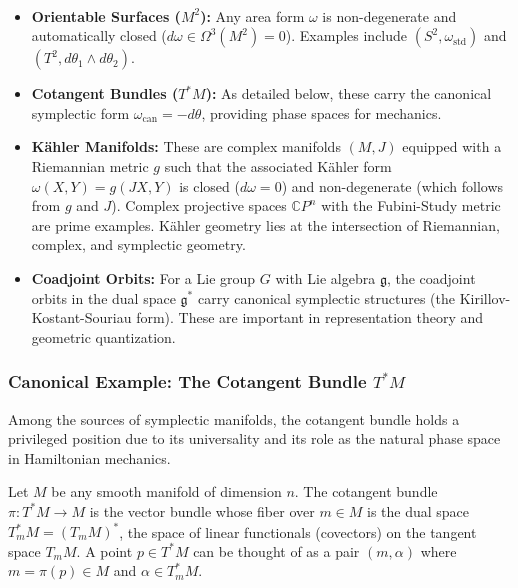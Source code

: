 \begin{example}
    \label{ex:symp_sources}
    \,
    \begin{itemize}
        \item \textbf{Orientable Surfaces ($M^2$):} Any area form $\omega$ is non-degenerate and automatically closed ($d\omega \in \Omega^3(M^2) = 0$). Examples include $(S^2, \omega_{\text{std}})$ and $(T^2, d\theta_1 \wedge d\theta_2)$.
        \item \textbf{Cotangent Bundles ($T^*M$):} As detailed below, these carry the canonical symplectic form $\omega_{\text{can}} = -d\theta$, providing phase spaces for mechanics.
        \item \textbf{Kähler Manifolds:} These are complex manifolds $(M, J)$ equipped with a Riemannian metric $g$ such that the associated Kähler form $\omega(X, Y) = g(JX, Y)$ is closed ($d\omega = 0$) and non-degenerate (which follows from $g$ and $J$). Complex projective spaces $\mathbb{C}P^n$ with the Fubini-Study metric are prime examples. Kähler geometry lies at the intersection of Riemannian, complex, and symplectic geometry.
        \item \textbf{Coadjoint Orbits:} For a Lie group $G$ with Lie algebra $\mathfrak{g}$, the coadjoint orbits in the dual space $\mathfrak{g}^*$ carry canonical symplectic structures (the Kirillov-Kostant-Souriau form). These are important in representation theory and geometric quantization.
    \end{itemize}
\end{example}

\subsubsection{Canonical Example: The Cotangent Bundle $T^*M$}

Among the sources of symplectic manifolds, the cotangent bundle holds a privileged position due to its universality and its role as the natural phase space in Hamiltonian mechanics.

Let $M$ be any smooth manifold of dimension $n$. The cotangent bundle $\pi: T^*M \to M$ is the vector bundle whose fiber over $m \in M$ is the dual space $T^*_m M = (T_m M)^*$, the space of linear functionals (covectors) on the tangent space $T_m M$. A point $p \in T^*M$ can be thought of as a pair $(m, \alpha)$ where $m = \pi(p) \in M$ and $\alpha \in T^*_m M$.

